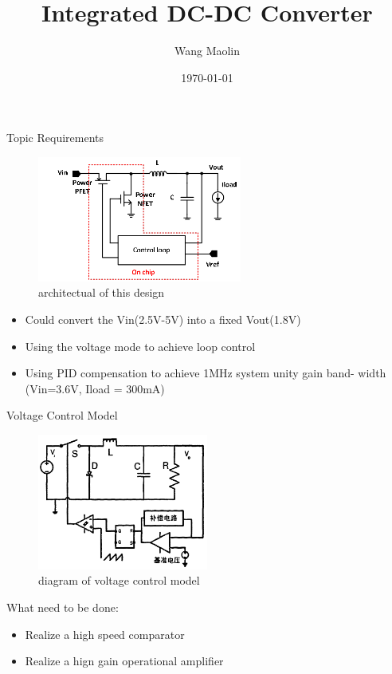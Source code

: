 \documentclass[10pt,mathserif]{beamer}%
\title{Integrated DC-DC Converter}
\institute[School of Microelectronics]{School of Microelectronics} %
\author{Wang Maolin}
\date{\today}%
\begin{document}
%
{\xdbg {}}%

\begin{frame}{Topic Requirements}
    \begin{figure}
    \includegraphics[width=0.6\textwidth]{images/topic_requirements.bmp}
    \caption{architectual of this design}
    \end{figure}
    \begin{itemize}
        \item Could convert the Vin(2.5V-5V) into a fixed Vout(1.8V)
        \item Using the voltage mode to achieve loop control
        \item Using PID compensation to achieve 1MHz system unity gain band- width (Vin=3.6V, Iload = 300mA)
    \end{itemize}
\end{frame}

\begin{frame}{Voltage Control Model}
	\begin{figure}
    \includegraphics[width=0.5\textwidth]{images/diagram_of_voltage_control_model.bmp}
    \caption{diagram of voltage control model}
    \end{figure}
    What need to be done:
    \begin{itemize}
        \item Realize a high speed comparator
        \item Realize a hign gain operational amplifier
    \end{itemize}
\end{frame}
\end{document}
